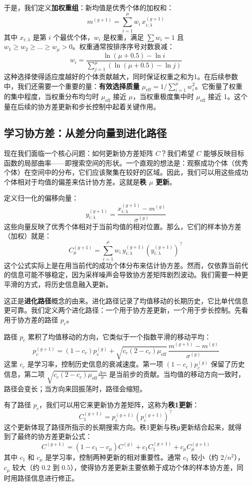 \documentclass[lang=cn,zihao=-4,a4paper,fontset=windows]{beautybook}
\begin{document}
于是，我们定义\textbf{加权重组}：新均值是优秀个体的加权和：
\[
m^{(g+1)} = \sum_{i=1}^{\mu} w_i \, x_{i:\lambda}^{(g+1)}
\]
其中 \(x_{i:\lambda}\) 是第 \(i\) 个最优个体，\(w_i\) 是权重，满足 \(\sum w_i = 1\) 且 \(w_1 \ge w_2 \ge \dots \ge w_\mu > 0\)。权重通常按排序序号对数衰减：
\[
w_i = \frac{\ln(\mu+0.5) - \ln i}{\sum_{j=1}^{\mu} (\ln(\mu+0.5) - \ln j)}
\]
这种选择使得适应度越好的个体贡献越大，同时保证权重之和为1。在后续参数中，我们还需要一个重要的量：\textbf{有效选择质量} \(\mu_{\text{eff}} = 1 / \sum_{i=1}^{\mu} w_i^2\)。它衡量了权重的集中程度，当权重分布均匀时 \(\mu_{\text{eff}}\) 接近 \(\mu\)，当权重极度集中时 \(\mu_{\text{eff}}\) 接近 1。这个量在后续的协方差更新和步长控制中起着关键作用。

\subsection{学习协方差：从差分向量到进化路径}

现在我们面临一个核心问题：如何更新协方差矩阵 \(C\)？我们希望 \(C\) 能够反映目标函数的局部曲率——即搜索空间的形状。一个直观的想法是：观察成功个体（优秀个体）在空间中的分布，它们应该聚集在较好的区域。因此，我们可以用这些成功个体相对于均值的偏差来估计协方差。这就是\textbf{秩 \(\mu\) 更新}。

定义归一化的偏移向量：
\[
y_{i:\lambda}^{(g+1)} = \frac{x_{i:\lambda}^{(g+1)} - m^{(g)}}{\sigma^{(g)}}
\]
这些向量反映了优秀个体相对于当前均值的相对位置。那么，它们的样本协方差（加权）就是：
\[
C_{\mu}^{(g+1)} = \sum_{i=1}^{\mu} w_i \, y_{i:\lambda}^{(g+1)} (y_{i:\lambda}^{(g+1)})^\top
\]
这个公式实际上是在用当前代的成功个体分布来估计协方差。然而，仅依靠当前代的信息可能不够稳定，因为采样噪声会导致协方差矩阵剧烈波动。我们需要一种更平滑的方式，将历史信息融入更新。

这正是\textbf{进化路径}概念的由来。进化路径记录了均值移动的长期历史，它比单代信息更可靠。我们定义两个进化路径：一个用于协方差更新，一个用于步长控制。先看用于协方差的路径 \(p_c\)。

路径 \(p_c\) 累积了均值移动的方向，它类似于一个指数平滑的移动平均：
\[
p_c^{(g+1)} = (1 - c_c) p_c^{(g)} + \sqrt{c_c(2 - c_c)\mu_{\text{eff}}} \, \frac{m^{(g+1)} - m^{(g)}}{\sigma^{(g)}}
\]
这里 \(c_c\) 是学习率，控制历史信息的衰减速度。第一项 \((1-c_c)p_c^{(g)}\) 保留了历史信息，第二项 \(\sqrt{c_c(2-c_c)\mu_{\text{eff}}} \frac{\Delta m}{\sigma}\) 是当前步的贡献。当均值的移动方向一致时，路径会变长；当方向来回振荡时，路径会缩短。

有了路径 \(p_c\)，我们可以用它来更新协方差矩阵，这称为\textbf{秩1更新}：
\[
C_1^{(g+1)} = p_c^{(g+1)} (p_c^{(g+1)})^\top
\]
这个更新体现了路径所指示的长期搜索方向。秩1更新与秩μ更新结合起来，就得到了最终的协方差更新公式：
\[
C^{(g+1)} = (1 - c_1 - c_\mu) C^{(g)} + c_1 C_1^{(g+1)} + c_\mu C_{\mu}^{(g+1)}
\]
其中 \(c_1\) 和 \(c_\mu\) 是学习率，控制两种更新的相对重要性。通常 \(c_1\) 较小（约 \(2/n^2\)），\(c_\mu\) 较大（约 \(0.2\) 到 \(0.5\)），使得协方差更新主要依赖于成功个体的样本协方差，同时用路径信息进行修正。
\end{document}
